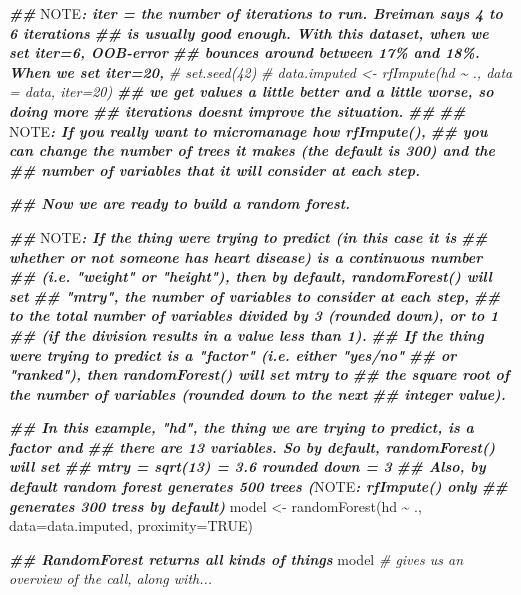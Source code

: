 \documentclass[
]{book}
\newenvironment{Shaded}{\begin{snugshade}}{\end{snugshade}}
\newcommand{\AlertTok}[1]{\textcolor[rgb]{0.94,0.16,0.16}{#1}}
\newcommand{\AttributeTok}[1]{\textcolor[rgb]{0.77,0.63,0.00}{#1}}
\newcommand{\CommentTok}[1]{\textcolor[rgb]{0.56,0.35,0.01}{\textit{#1}}}
\newcommand{\ConstantTok}[1]{\textcolor[rgb]{0.00,0.00,0.00}{#1}}
\newcommand{\DocumentationTok}[1]{\textcolor[rgb]{0.56,0.35,0.01}{\textbf{\textit{#1}}}}
\newcommand{\FunctionTok}[1]{\textcolor[rgb]{0.00,0.00,0.00}{#1}}
\newcommand{\NormalTok}[1]{#1}
\newcommand{\OtherTok}[1]{\textcolor[rgb]{0.56,0.35,0.01}{#1}}
\newcommand{\SpecialCharTok}[1]{\textcolor[rgb]{0.00,0.00,0.00}{#1}}
\begin{document}
\begin{Shaded}
\begin{Highlighting}[]
\DocumentationTok{\#\# }\AlertTok{NOTE}\DocumentationTok{: iter = the number of iterations to run. Breiman says 4 to 6 iterations}
\DocumentationTok{\#\# is usually good enough. With this dataset, when we set iter=6, OOB{-}error}
\DocumentationTok{\#\# bounces around between 17\% and 18\%. When we set iter=20,}
\CommentTok{\# set.seed(42)}
\CommentTok{\# data.imputed \textless{}{-} rfImpute(hd \textasciitilde{} ., data = data, iter=20)}
\DocumentationTok{\#\# we get values a little better and a little worse, so doing more}
\DocumentationTok{\#\# iterations doesn\textquotesingle{}t improve the situation.}
\DocumentationTok{\#\#}
\DocumentationTok{\#\# }\AlertTok{NOTE}\DocumentationTok{: If you really want to micromanage how rfImpute(),}
\DocumentationTok{\#\# you can change the number of trees it makes (the default is 300) and the}
\DocumentationTok{\#\# number of variables that it will consider at each step.}

\DocumentationTok{\#\# Now we are ready to build a random forest.}

\DocumentationTok{\#\# }\AlertTok{NOTE}\DocumentationTok{: If the thing we\textquotesingle{}re trying to predict (in this case it is}
\DocumentationTok{\#\# whether or not someone has heart disease) is a continuous number}
\DocumentationTok{\#\# (i.e. "weight" or "height"), then by default, randomForest() will set}
\DocumentationTok{\#\# "mtry", the number of variables to consider at each step,}
\DocumentationTok{\#\# to the total number of variables divided by 3 (rounded down), or to 1}
\DocumentationTok{\#\# (if the division results in a value less than 1).}
\DocumentationTok{\#\# If the thing we\textquotesingle{}re trying to predict is a "factor" (i.e. either "yes/no"}
\DocumentationTok{\#\# or "ranked"), then randomForest() will set mtry to}
\DocumentationTok{\#\# the square root of the number of variables (rounded down to the next}
\DocumentationTok{\#\# integer value).}

\DocumentationTok{\#\# In this example, "hd", the thing we are trying to predict, is a factor and}
\DocumentationTok{\#\# there are 13 variables. So by default, randomForest() will set}
\DocumentationTok{\#\# mtry = sqrt(13) = 3.6 rounded down = 3}
\DocumentationTok{\#\# Also, by default random forest generates 500 trees (}\AlertTok{NOTE}\DocumentationTok{: rfImpute() only}
\DocumentationTok{\#\# generates 300 tress by default)}
\NormalTok{model }\OtherTok{\textless{}{-}} \FunctionTok{randomForest}\NormalTok{(hd }\SpecialCharTok{\textasciitilde{}}\NormalTok{ ., }\AttributeTok{data=}\NormalTok{data.imputed, }\AttributeTok{proximity=}\ConstantTok{TRUE}\NormalTok{)}

\DocumentationTok{\#\# RandomForest returns all kinds of things}
\NormalTok{model }\CommentTok{\# gives us an overview of the call, along with...}
\end{Highlighting}
\end{Shaded}
\end{document}
